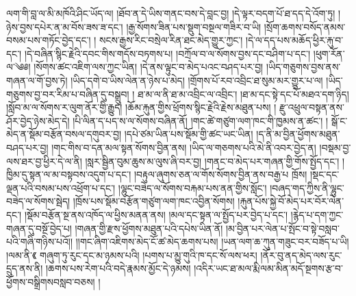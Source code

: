 ལག་གི་བླ་ལ་མི་མཁོའི་ཤིང་ཡོད་ལ། །ཐོབ་ན་དེ་ཡིས་གནང་བས་དེ་བླང་བྱ། །དེ་ལྟར་བདག་པོ་ཐ་དད་དེ་འོག་ཏུ། །ཉེས་བྱས་དཔེར་ན་མ་བོས་ཟས་ཟ་དང་། །རྒྱ་སོགས་ཟིན་པས་སྡུག་བསྔལ་གཟིར་བ་ཡི། །སྲོག་ཆགས་བསོད་ནམས་བསམ་པས་གཏོང་བྱེད་དང་། ། སངས་རྒྱས་རིང་བསྲེལ་རིན་ཐང་མེད་གྱུར་ཀྱང་། །དེ་ལ་དད་པས་མཆོད་ཕྱིར་རྐུ་བ་དང་། །དེ་བཞིན་སྙིང་རྗེའི་དབང་གིས་གདོས་བཏགས་པ། །བཀྲོལ་བ་ལ་སོགས་བྱས་དང་བཤིག་པ་དང་། །ཕུག་རོན་ལ་༄༅། །སོགས་ཚང་འཇིག་ལས་ཀྱང་ཡིན། །དེ་ནས་ལྟུང་བ་མེད་པའང་བཤད་པར་བྱ། །ཡིད་གཅུགས་བྱས་ནས་གཞན་ལ་གོ་བྱས་ཏེ། །ཡིད་དགེ་བ་ཡིས་ལེན་ན་ཉེས་པ་མེད། །གྲོགས་པོ་རབ་འབྲིང་ཐ་སུམ་མར་གྱུར་པ་ལ། །ཡིད་གཅུགས་བྱ་བར་རིམ་པ་བཞིན་དུ་བསྒྲུབ། ། ཐ་མ་ལ་ནི་ཐ་མ་འབྲིང་ལ་འབྲིང་། །ཐ་མ་དང་སྟེ་དང་པོ་མཐའ་དག་ཉིད། །སློབ་མ་ལ་སོགས་ར་ལུག་ནོར་གྱི་རྒྱུད། །ཆོམ་རྐུན་གྱིས་ཕྲོགས་སྙིང་རྗེའི་རྗེས་མཐུན་པས། ། རྫུ་འཕྲུལ་བསྟན་ནས་ཤོར་བྱེད་ཉེས་མེད་དེ། །པི་ལིན་ད་པད་ས་ལ་སོགས་བཞིན་ནོ། །གང་ཚེ་གཙུག་ལག་ཁང་གི་ཁྱམས་ན་ཚང་། ། སྒོ་ང་མེད་ན་སྡོམ་བརྩོན་བསལ་དགུབར་བྱ། །དཔེ་ཙམ་ཡིན་པས་སྡོམ་གྱི་ཚང་ཡང་ཡིན། །ད་ནི་མ་བྱིན་ཕྱོགས་མཐུན་བཤད་པར་བྱ། །གང་གིས་བ་དན་མལ་སྟན་སོགས་བྱིན་ནས། །ཡིད་ལ་གཅགས་པའི་མེ་ནི་འབར་བྱེད་ན། །བསྡམ་བྱ་ལས་ཐར་བྱ་ཕྱིར་དེ་ལ་ནི། །སླར་སྦྱིན་བུམ་ཆུས་མ་ལུས་ཞི་བར་བྱ། །གནང་བ་མེད་པར་གཞན་གྱི་གོས་སྤྱོད་དང་། །ཁྱིམ་དུ་སྟན་ལ་མ་བསྟབས་འདུག་པ་དང་། །བརྟུལ་ཞུགས་ཅན་ལ་གོས་སོགས་བྱིན་ནས་བརྒྱ་པ ཁྲོས། །སྡང་དང་ལྡན་པའི་བསམ་པས་འཕྲོག་པ་དང་། །ལྷུང་བཟེད་ལ་སོགས་བརྐམ་པས་ནན་གྱིས་སློང་། །བཞད་གད་ཀྱིས་ནི་ལྷུང་བཟེད་ལ་སོགས་སྦེད། །ཁྲོས་པས་སྡོམ་བརྩོན་གཙུག་ལག་ཁང་འབྱིན་སོགས། །རྐུན་པོས་སྐྱེ་བོ་མེད་པར་བོར་ལེན་དང་། །སྡོམ་བརྩོན་སྔ་ནས་འཁོད་ལ་ཕྱིས་མནན་ནས། །མལ་དང་སྟན་ལ་སྤྱོད་པར་བྱེད་པ་དང་། །རྙེད་པ་དག་ཀྱང་གཞན་དུ་བསྔོ་བྱེད་པ། །གཞན་གྱི་རྫས་ཕྱོགས་མཐུན་པའི་དཔེས་ཡིན་ནོ། །མ་བྱིན་པར་ལེན་པ་སྤོང་བ་སྟེ་བསླབ་པའི་གཞི་གཉིས་པའོ།། །།གང་ཞིག་འཇིགས་མེད་ངོ་ཚ་མེད་ཆགས་པས། །ཡན་ལག་ཆ་ཀུན་གཟུང་བར་བཟོད་པ་ཡི། །ལམ་ནི་《 གཞུག་ཏུ་རུང་དང་མ་ཉམས་པའི། །པགས་པ་མྱུ་གུའི་ཁ་དང་སོ་ལས་ཕར། །ནོར་བུ་ནད་མེད་ལས་རུང་དྲུད་ནས་ནི། །ཆགས་པས་རེག་པའི་བདེ་རྣམས་མྱོང་དེ་ཉམས། །འདིར་ཡང་ཐ་མལ་རྨི་ལམ་མིན་མདོ་སྔགས་རྩ་བ་ཕྱོགས་བསྒྲིགསབསླབ་བཅས། །
